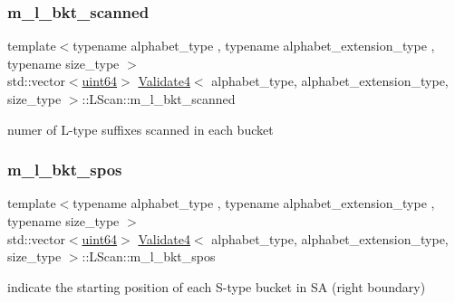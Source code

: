 \subsubsection{\texorpdfstring{m\+\_\+l\+\_\+bkt\+\_\+scanned}{m\_l\_bkt\_scanned}}
{\footnotesize\ttfamily template$<$typename alphabet\+\_\+type , typename alphabet\+\_\+extension\+\_\+type , typename size\+\_\+type $>$ \\
std\+::vector$<$\hyperlink{types_8h_a60e8696a4678cd348e991a1f172e53f7}{uint64}$>$ \hyperlink{class_validate4}{Validate4}$<$ alphabet\+\_\+type, alphabet\+\_\+extension\+\_\+type, size\+\_\+type $>$\+::L\+Scan\+::m\+\_\+l\+\_\+bkt\+\_\+scanned\hspace{0.3cm}{\ttfamily [private]}}



numer of L-\/type suffixes scanned in each bucket 

\mbox{\label{struct_validate4_1_1_l_scan_a82878f6289ad8c9ec7204de1e5a2e04c}} 
\subsubsection{\texorpdfstring{m\+\_\+l\+\_\+bkt\+\_\+spos}{m\_l\_bkt\_spos}}
{\footnotesize\ttfamily template$<$typename alphabet\+\_\+type , typename alphabet\+\_\+extension\+\_\+type , typename size\+\_\+type $>$ \\
std\+::vector$<$\hyperlink{types_8h_a60e8696a4678cd348e991a1f172e53f7}{uint64}$>$ \hyperlink{class_validate4}{Validate4}$<$ alphabet\+\_\+type, alphabet\+\_\+extension\+\_\+type, size\+\_\+type $>$\+::L\+Scan\+::m\+\_\+l\+\_\+bkt\+\_\+spos\hspace{0.3cm}{\ttfamily [private]}}



indicate the starting position of each S-\/type bucket in SA (right boundary) 

\mbox{\label{struct_validate4_1_1_l_scan_ad500f8ccaffab088a465a288f92fd4b2}} 
